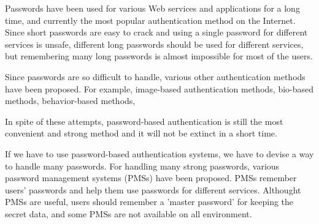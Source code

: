 \documentclass{article}
\begin{document}
Passwords have been used for various Web services and applications
for a long time, and currently the most popular authentication method
on the Internet.
Since short passwords are easy to crack and
using a single password for different services is unsafe,
different long passwords should be used for different services,
but remembering many long passwords is almost impossible for
most of the users.

%   

Since passwords are so difficult to handle,
various other authentication methods have been proposed.
For example,
image-based authentication methods\cite{xxx},
bio-based methods\cite{},
behavior-based methods\cite{},


In spite of these attempts,
password-based authentication is still the most
convenient and strong method\cite{Bonneau}
and it will not be extinct in a short time.

%   


If we have to use password-based authentication systems,
we have to devise a way to handle many passwords.
For handling many strong passwords,
various password management systems (PMSs) have been proposed\cite{xxx}\cite{yyy}.
PMSs remember users' passwords and help them use passwords for different services.
Althought PMSs are useful, users should remember a 'master password' for
keeping the secret data, and
some PMSs are not available on all environment.

\end{document}
